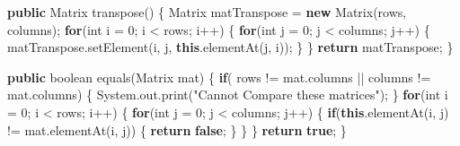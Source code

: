 \documentclass[
  12pt,
]{article}
\newenvironment{Shaded}{}{}
\newcommand{\BuiltInTok}[1]{\textcolor[rgb]{0.00,0.50,0.00}{#1}}
\newcommand{\ControlFlowTok}[1]{\textcolor[rgb]{0.00,0.44,0.13}{\textbf{#1}}}
\newcommand{\DataTypeTok}[1]{\textcolor[rgb]{0.56,0.13,0.00}{#1}}
\newcommand{\DecValTok}[1]{\textcolor[rgb]{0.25,0.63,0.44}{#1}}
\newcommand{\FunctionTok}[1]{\textcolor[rgb]{0.02,0.16,0.49}{#1}}
\newcommand{\KeywordTok}[1]{\textcolor[rgb]{0.00,0.44,0.13}{\textbf{#1}}}
\newcommand{\NormalTok}[1]{#1}
\newcommand{\OperatorTok}[1]{\textcolor[rgb]{0.40,0.40,0.40}{#1}}
\newcommand{\StringTok}[1]{\textcolor[rgb]{0.25,0.44,0.63}{#1}}
\begin{document}
\begin{Shaded}
\begin{Highlighting}[numbers=left,,]
    \KeywordTok{public}\NormalTok{ Matrix }\FunctionTok{transpose}\OperatorTok{()}
    \OperatorTok{\{}
\NormalTok{        Matrix matTranspose }\OperatorTok{=} \KeywordTok{new} \FunctionTok{Matrix}\OperatorTok{(}\NormalTok{rows}\OperatorTok{,}\NormalTok{ columns}\OperatorTok{);}
        \ControlFlowTok{for}\OperatorTok{(}\DataTypeTok{int}\NormalTok{ i }\OperatorTok{=} \DecValTok{0}\OperatorTok{;}\NormalTok{ i }\OperatorTok{\textless{}}\NormalTok{ rows}\OperatorTok{;}\NormalTok{ i}\OperatorTok{++)}
        \OperatorTok{\{}
            \ControlFlowTok{for}\OperatorTok{(}\DataTypeTok{int}\NormalTok{ j }\OperatorTok{=} \DecValTok{0}\OperatorTok{;}\NormalTok{ j }\OperatorTok{\textless{}}\NormalTok{ columns}\OperatorTok{;}\NormalTok{ j}\OperatorTok{++)}
            \OperatorTok{\{}
\NormalTok{                matTranspose}\OperatorTok{.}\FunctionTok{setElement}\OperatorTok{(}\NormalTok{i}\OperatorTok{,}\NormalTok{ j}\OperatorTok{,} \KeywordTok{this}\OperatorTok{.}\FunctionTok{elementAt}\OperatorTok{(}\NormalTok{j}\OperatorTok{,}\NormalTok{ i}\OperatorTok{));}
            \OperatorTok{\}}
        \OperatorTok{\}}
        \ControlFlowTok{return}\NormalTok{ matTranspose}\OperatorTok{;}
    \OperatorTok{\}}

    \KeywordTok{public} \DataTypeTok{boolean} \FunctionTok{equals}\OperatorTok{(}\NormalTok{Matrix mat}\OperatorTok{)}
    \OperatorTok{\{}
        \ControlFlowTok{if}\OperatorTok{(}\NormalTok{ rows }\OperatorTok{!=}\NormalTok{ mat}\OperatorTok{.}\FunctionTok{columns} \OperatorTok{||}\NormalTok{ columns }\OperatorTok{!=}\NormalTok{ mat}\OperatorTok{.}\FunctionTok{columns}\OperatorTok{)}
        \OperatorTok{\{}
            \BuiltInTok{System}\OperatorTok{.}\FunctionTok{out}\OperatorTok{.}\FunctionTok{print}\OperatorTok{(}\StringTok{"Cannot Compare these matrices"}\OperatorTok{);}
        \OperatorTok{\}}
        \ControlFlowTok{for}\OperatorTok{(}\DataTypeTok{int}\NormalTok{ i }\OperatorTok{=} \DecValTok{0}\OperatorTok{;}\NormalTok{ i }\OperatorTok{\textless{}}\NormalTok{ rows}\OperatorTok{;}\NormalTok{ i}\OperatorTok{++)}
        \OperatorTok{\{}
            \ControlFlowTok{for}\OperatorTok{(}\DataTypeTok{int}\NormalTok{ j }\OperatorTok{=} \DecValTok{0}\OperatorTok{;}\NormalTok{ j }\OperatorTok{\textless{}}\NormalTok{ columns}\OperatorTok{;}\NormalTok{ j}\OperatorTok{++)}
            \OperatorTok{\{}
                \ControlFlowTok{if}\OperatorTok{(}\KeywordTok{this}\OperatorTok{.}\FunctionTok{elementAt}\OperatorTok{(}\NormalTok{i}\OperatorTok{,}\NormalTok{ j}\OperatorTok{)} \OperatorTok{!=}\NormalTok{ mat}\OperatorTok{.}\FunctionTok{elementAt}\OperatorTok{(}\NormalTok{i}\OperatorTok{,}\NormalTok{ j}\OperatorTok{))}
                \OperatorTok{\{}
                    \ControlFlowTok{return} \KeywordTok{false}\OperatorTok{;}
                \OperatorTok{\}}
            \OperatorTok{\}}
        \OperatorTok{\}}
        \ControlFlowTok{return} \KeywordTok{true}\OperatorTok{;}
    \OperatorTok{\}}


\end{Highlighting}
\end{Shaded}
\end{document}
